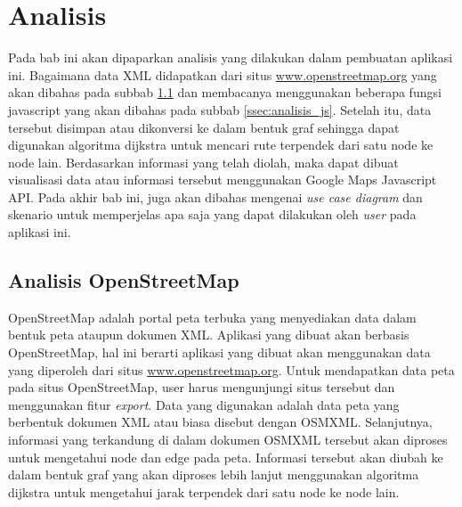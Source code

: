 \chapter{Analisis}
Pada bab ini akan dipaparkan analisis yang dilakukan dalam pembuatan aplikasi
ini. Bagaimana data XML didapatkan dari situs \url{www.openstreetmap.org}
yang akan dibahas pada subbab \ref{ssec:analisis_osm} dan membacanya
menggunakan beberapa fungsi javascript yang akan dibahas
pada subbab \ref{ssec:analisis_js}. Setelah itu, data tersebut disimpan atau
dikonversi ke dalam bentuk graf sehingga dapat digunakan algoritma dijkstra untuk mencari rute 
terpendek dari satu node ke node lain. Berdasarkan informasi yang telah diolah,
maka dapat dibuat visualisasi data atau informasi tersebut menggunakan Google
Maps Javascript API. Pada akhir bab ini, juga akan dibahas mengenai \textit{use
case diagram} dan skenario untuk memperjelas apa saja yang dapat dilakukan oleh
\textit{user} pada aplikasi ini.

\section{Analisis OpenStreetMap} \label{ssec:analisis_osm}
OpenStreetMap adalah portal peta terbuka yang menyediakan data dalam bentuk peta
ataupun dokumen XML. Aplikasi yang dibuat akan berbasis OpenStreetMap, hal ini
berarti aplikasi yang dibuat akan menggunakan data yang diperoleh dari situs
\url{www.openstreetmap.org}. Untuk mendapatkan data peta pada situs
OpenStreetMap, user harus mengunjungi situs tersebut dan menggunakan fitur
\textit{export}. Data yang digunakan adalah data peta yang berbentuk
dokumen XML atau biasa disebut dengan OSMXML. Selanjutnya, informasi yang
terkandung di dalam dokumen OSMXML tersebut akan diproses untuk mengetahui node dan edge
pada peta. Informasi tersebut akan diubah ke dalam bentuk graf yang akan
diproses lebih lanjut menggunakan algoritma dijkstra untuk mengetahui jarak
terpendek dari satu node ke node lain.

